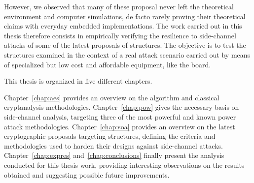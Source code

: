 However, we observed that many of these proposal never left the theoretical environment and computer simulations, de facto rarely proving their theoretical claims with everyday embedded implementations. The work carried out in this thesis therefore consists in empirically verifying the resilience to side-channel attacks of some of the latest proposals of \sbocs{} structures. The objective is to test the structures examined in the context of a real attack scenario carried out by means of specialized but low cost and affordable equipment, like the \cw{} board.

\bigskip

\noindent This thesis is organized in five different chapters. 

Chapter~\ref{chap:aes} provides an overview on the \aes{} algorithm and classical cryptanalysis methodologies. Chapter~\ref{chap:pow} gives the necessary basis on side-channel analysis, targeting three of the most powerful and known power attack methodologies. Chapter~\ref{chap:soa} provides an overview on the latest cryptographic proposals targeting \sbocs{} structures, defining the criteria and methodologies used to harden their designs against side-channel attacks. Chapter~\ref{chap:expres} and~\ref{chap:conclusions} finally present the analysis conducted for this thesis work, providing interesting observations on the results obtained and suggesting possible future improvements.